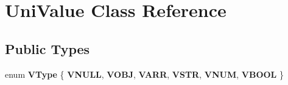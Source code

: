 \hypertarget{class_uni_value}{}\section{Uni\+Value Class Reference}
\label{class_uni_value}
\subsection*{Public Types}
\begin{DoxyCompactItemize}
\item 
\mbox{\label{class_uni_value_a2f9803e567ede73e88302b01e394cc63}} 
enum {\bfseries V\+Type} \{ \newline
{\bfseries V\+N\+U\+LL}, 
{\bfseries V\+O\+BJ}, 
{\bfseries V\+A\+RR}, 
{\bfseries V\+S\+TR}, 
\newline
{\bfseries V\+N\+UM}, 
{\bfseries V\+B\+O\+OL}
 \}
\end{DoxyCompactItemize}
